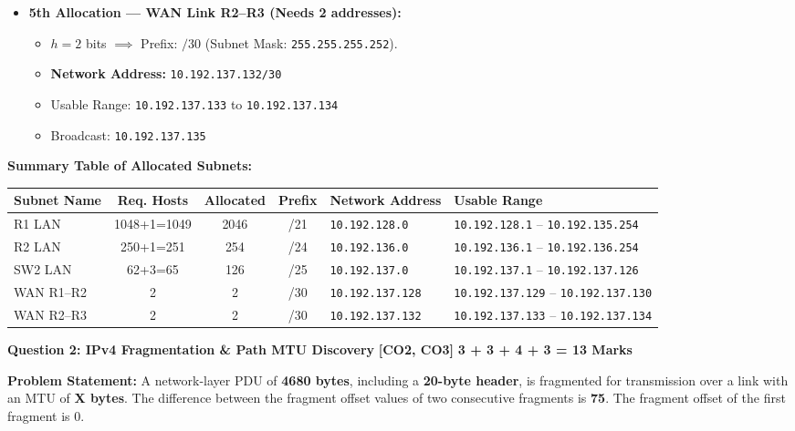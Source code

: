 \documentclass[11pt,a4paper]{article}
\newcommand{\questionheader}[3]{
    \vspace{0.35cm}
    \noindent\colorbox{qboxbg}{
        \parbox{\dimexpr\textwidth-2\fboxsep\relax}{
            \textbf{\textcolor{primary}{\large #1}} \hfill \textbf{\textcolor{accent}{[#2]}} \hfill \textbf{\textcolor{secondary}{#3 Marks}}
        }
    }
    \vspace{0.15cm}
}
\begin{document}
\begin{enumerate}
\begin{itemize}
        \item \textbf{5th Allocation --- WAN Link R2--R3 (Needs 2 addresses):}
        \begin{itemize}
            \item $h = 2$ bits $\implies$ Prefix: $/30$ (Subnet Mask: \texttt{255.255.255.252}).
            \item \textbf{Network Address:} \texttt{10.192.137.132/30}
            \item Usable Range: \texttt{10.192.137.133} to \texttt{10.192.137.134}
            \item Broadcast: \texttt{10.192.137.135}
        \end{itemize}
    \end{itemize}
\end{enumerate}

\textbf{Summary Table of Allocated Subnets:}
\begin{center}
\begin{tabular}{|l|c|c|c|l|l|}
\hline
\textbf{Subnet Name} & \textbf{Req. Hosts} & \textbf{Allocated} & \textbf{Prefix} & \textbf{Network Address} & \textbf{Usable Range} \\
\hline
R1 LAN & 1048+1=1049 & 2046 & /21 & \texttt{10.192.128.0} & \texttt{10.192.128.1} -- \texttt{10.192.135.254} \\
R2 LAN & 250+1=251 & 254 & /24 & \texttt{10.192.136.0} & \texttt{10.192.136.1} -- \texttt{10.192.136.254} \\
SW2 LAN & 62+3=65 & 126 & /25 & \texttt{10.192.137.0} & \texttt{10.192.137.1} -- \texttt{10.192.137.126} \\
WAN R1--R2 & 2 & 2 & /30 & \texttt{10.192.137.128} & \texttt{10.192.137.129} -- \texttt{10.192.137.130} \\
WAN R2--R3 & 2 & 2 & /30 & \texttt{10.192.137.132} & \texttt{10.192.137.133} -- \texttt{10.192.137.134} \\
\hline
\end{tabular}
\end{center}

\newpage
\questionheader{Question 2: IPv4 Fragmentation \& Path MTU Discovery}{CO2, CO3}{3 + 3 + 4 + 3 = 13}

\textbf{Problem Statement:}
A network-layer PDU of \textbf{4680 bytes}, including a \textbf{20-byte header}, is fragmented for transmission over a link with an MTU of \textbf{X bytes}. The difference between the fragment offset values of two consecutive fragments is \textbf{75}. The fragment offset of the first fragment is 0.
\end{document}
